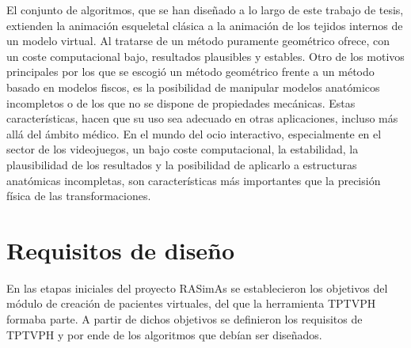 El conjunto de algoritmos, que se han diseñado a lo largo de este trabajo de tesis, extienden la animación esqueletal clásica a la animación de los tejidos internos de un modelo virtual. Al tratarse de un método puramente geométrico ofrece, con un coste computacional bajo, resultados plausibles y estables. Otro de los motivos principales por los que se escogió un método geométrico frente a un método basado en modelos fiscos, es la posibilidad de manipular modelos anatómicos incompletos o de los que no se dispone de propiedades mecánicas. Estas características, hacen que su uso sea adecuado en otras aplicaciones, incluso más allá del ámbito médico.  En el mundo del ocio interactivo, especialmente en el sector de los videojuegos, un bajo coste computacional, la estabilidad, la plausibilidad de los resultados y la posibilidad de aplicarlo a estructuras anatómicas incompletas, son características más importantes que la precisión física de las transformaciones. 


\section{Requisitos de diseño}
\label{posing:req}

En las etapas iniciales del proyecto \ac{RASimAs} se establecieron los objetivos del módulo de creación de pacientes virtuales, del que la herramienta \ac{TPTVPH} formaba parte. A partir de dichos objetivos se definieron los requisitos de \ac{TPTVPH} y por ende de los algoritmos que debían ser diseñados.


